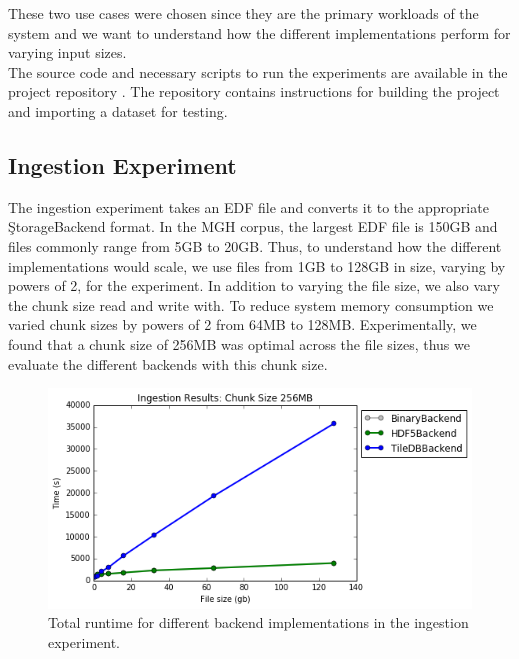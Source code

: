 These two use cases were chosen since they are the primary workloads of the
system and we want to understand how the different implementations perform for
varying input sizes.\\

The source code and necessary scripts to run the experiments are available
in the project repository \cite{eeg-toolkit}. The repository contains
instructions for building the project and importing a dataset for testing.

\subsection{Ingestion Experiment}\label{storage-ch:ingestion-exp}

The ingestion experiment takes an EDF file and converts it to the appropriate
\c{StorageBackend} format. In the MGH corpus, the largest EDF file is 150GB and
files commonly range from 5GB to 20GB. Thus, to understand how the different
implementations would scale, we use files from 1GB to 128GB in size, varying by
powers of 2, for the experiment. In addition to varying the file size, we also
vary the chunk size read and write with. To reduce system memory consumption we
varied chunk sizes by powers of 2 from 64MB to 128MB. Experimentally, we found
that a chunk size of 256MB was optimal across the file sizes, thus we evaluate
the different backends with this chunk size.

\begin{figure}[h]
\begin{center}
\includegraphics[scale=.75]{./img/ingestion-exp.png}
\caption{Total runtime for different backend implementations in the ingestion
  experiment.}
\label{fig:ingestion-exp}
\end{center}
\end{figure}

